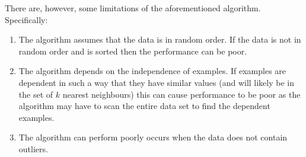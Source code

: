 There are, however, some limitations of the aforementioned algorithm.
Specifically:
\begin{enumerate}
    \item The algorithm assumes that the data is in random order. If the data is
        not in random order and is sorted then the performance can be poor.
    \item The algorithm depends on the independence of examples. If examples are
        dependent in such a way that they have similar values (and will likely
        be in the set of $k$ nearest neighbours) this can cause performance to
        be poor as the algorithm may have to scan the entire data set to find
        the dependent examples.
    \item The algorithm can perform poorly occurs when the data does not contain
        outliers.
\end{enumerate}

